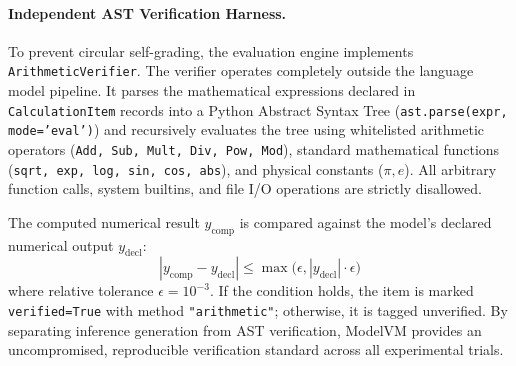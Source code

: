 \paragraph{Independent AST Verification Harness.}
To prevent circular self-grading, the evaluation engine implements \texttt{ArithmeticVerifier}. The verifier operates completely outside the language model pipeline. It parses the mathematical expressions declared in \texttt{CalculationItem} records into a Python Abstract Syntax Tree (\texttt{ast.parse(expr, mode='eval')}) and recursively evaluates the tree using whitelisted arithmetic operators (\texttt{Add, Sub, Mult, Div, Pow, Mod}), standard mathematical functions (\texttt{sqrt, exp, log, sin, cos, abs}), and physical constants ($\pi, e$). All arbitrary function calls, system builtins, and file I/O operations are strictly disallowed.

The computed numerical result $y_{\text{comp}}$ is compared against the model's declared numerical output $y_{\text{decl}}$:
\begin{equation}
|y_{\text{comp}} - y_{\text{decl}}| \le \max\big(\epsilon, |y_{\text{decl}}| \cdot \epsilon\big)
\end{equation}
where relative tolerance $\epsilon = 10^{-3}$. If the condition holds, the item is marked \texttt{verified=True} with method \texttt{"arithmetic"}; otherwise, it is tagged unverified. By separating inference generation from AST verification, ModelVM provides an uncompromised, reproducible verification standard across all experimental trials.
\FloatBarrier

